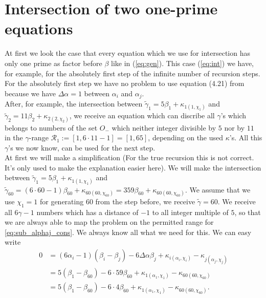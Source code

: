 \documentclass{amsart}
\begin{document}
\section{Intersection of two one-prime equations}
\label{s:oneprime}
At first we look the case that every equation which we use for intersection has only one prime as factor before $\beta$ like in (\ref{eq:gen}). This case (\ref{eq:int}) we have, for example, for the absolutely first step of the infinite number of recursion steps.\\
For the absolutely first step we have no problem to use equation (4.21) from \cite{CaZoeb} because we have $\Delta \alpha = 1$ between $\alpha_{i}$ and $\alpha_{j}$.\\
After, for example, the intersection between $\tilde{\gamma}_{1}=5\beta_{1} + \kappa_{1\left(1,\chi_{1}\right)}$ and $\tilde{\gamma}_{2}=11\beta_{2} + \kappa_{2\left(2,\chi_{2}\right)}$, we receive an equation which can discribe all $\gamma$'s which belongs to numbers of the set $O_{-}$ which neither integer divisible by $5$ nor by $11$ in the $\gamma$-range $\mathcal{R}_{1}:=[1,6\cdot 11 - 1]=[1,65]$, depending on the used $\kappa$'s. All this $\gamma$'s we now know, can be used for the next step.\\
At first we will make a simplification (For the true recursion this is not correct. It's only used to make the explanation easier here). We will make the intersection between $\tilde{\gamma}_{1}=5\beta_{1} + \kappa_{1\left(1,\chi_{1}\right)}$ and $\tilde{\gamma}_{60}=\left(6\cdot 60 - 1\right)\beta_{60} + \kappa_{60\left(60,\chi_{60}\right)} = 359\beta_{60} + \kappa_{60\left(60,\chi_{60}\right)}$. We assume that we use $\chi_{1} = 1$ for generating $60$ from the step before, we receive $\tilde{\gamma} = 60$. We receive all $6\gamma - 1$ numbers which has a distance of $-1$ to all integer multiple of $5$, so that we are always able to map the problem on the permitted range for \ref{eq:sub_alphaj_cons}. We always know all what we need for this. We can easy write
\begin{equation}\begin{split}
	0 & = \left(6\alpha_{i} - 1\right)\left(\beta_{i} - \beta_{j}\right) - 6\Delta\alpha\beta_{j} + \kappa_{i\left(\alpha_{i},\chi_{i}\right)} - \kappa_{j\left(\alpha_{j},\chi_{j}\right)} \\
	& = 5\left(\beta_{1} - \beta_{60}\right) - 6\cdot 59 \beta_{60} + \kappa_{1\left(\alpha_{1},\chi_{1}\right)} - \kappa_{60\left(60,\chi_{60}\right)} \\
	& = 5\left(\beta_{1} - \beta_{60}\right) - 6\cdot 4 \beta_{60} + \kappa_{1\left(\alpha_{1},\chi_{1}\right)} - \kappa_{60\left(60,\chi_{60}\right)}.
\end{split}\label{eq:writeeasy}\end{equation}
\end{document}
